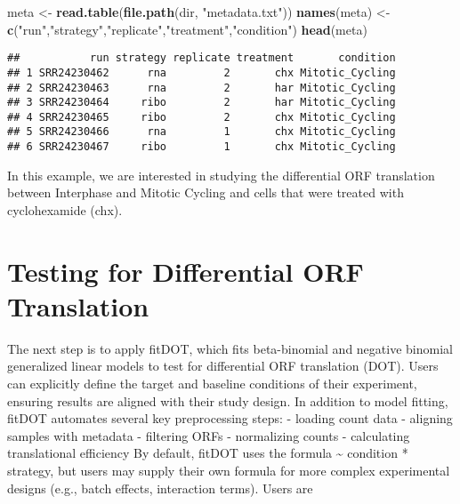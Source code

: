 \documentclass[
]{article}
\newenvironment{Shaded}{\begin{snugshade}}{\end{snugshade}}
\newcommand{\CommentTok}[1]{\textcolor[rgb]{0.56,0.35,0.01}{\textit{#1}}}
\newcommand{\ConstantTok}[1]{\textcolor[rgb]{0.56,0.35,0.01}{#1}}
\newcommand{\FunctionTok}[1]{\textcolor[rgb]{0.13,0.29,0.53}{\textbf{#1}}}
\newcommand{\NormalTok}[1]{#1}
\newcommand{\OtherTok}[1]{\textcolor[rgb]{0.56,0.35,0.01}{#1}}
\newcommand{\SpecialCharTok}[1]{\textcolor[rgb]{0.81,0.36,0.00}{\textbf{#1}}}
\newcommand{\StringTok}[1]{\textcolor[rgb]{0.31,0.60,0.02}{#1}}
\begin{document}
\begin{Shaded}
\begin{Highlighting}[]
\NormalTok{meta }\OtherTok{\textless{}{-}} \FunctionTok{read.table}\NormalTok{(}\FunctionTok{file.path}\NormalTok{(dir, }\StringTok{"metadata.txt"}\NormalTok{))}
\FunctionTok{names}\NormalTok{(meta) }\OtherTok{\textless{}{-}}  \FunctionTok{c}\NormalTok{(}\StringTok{"run"}\NormalTok{,}\StringTok{"strategy"}\NormalTok{,}\StringTok{"replicate"}\NormalTok{,}\StringTok{"treatment"}\NormalTok{,}\StringTok{"condition"}\NormalTok{)}
\FunctionTok{head}\NormalTok{(meta)}
\end{Highlighting}
\end{Shaded}

\begin{verbatim}
##           run strategy replicate treatment       condition
## 1 SRR24230462      rna         2       chx Mitotic_Cycling
## 2 SRR24230463      rna         2       har Mitotic_Cycling
## 3 SRR24230464     ribo         2       har Mitotic_Cycling
## 4 SRR24230465     ribo         2       chx Mitotic_Cycling
## 5 SRR24230466      rna         1       chx Mitotic_Cycling
## 6 SRR24230467     ribo         1       chx Mitotic_Cycling
\end{verbatim}

In this example, we are interested in studying the differential ORF
translation between Interphase and Mitotic Cycling and cells that were
treated with cyclohexamide (chx).

\begin{Shaded}
\end{Shaded}

\section{Testing for Differential ORF
Translation}\label{testing-for-differential-orf-translation}

The next step is to apply fitDOT, which fits beta-binomial and negative
binomial generalized linear models to test for differential ORF
translation (DOT). Users can explicitly define the target and baseline
conditions of their experiment, ensuring results are aligned with their
study design. In addition to model fitting, fitDOT automates several key
preprocessing steps: - loading count data - aligning samples with
metadata - filtering ORFs - normalizing counts - calculating
translational efficiency By default, fitDOT uses the formula
\textasciitilde{} condition * strategy, but users may supply their own
formula for more complex experimental designs (e.g., batch effects,
interaction terms). Users are
\end{document}
